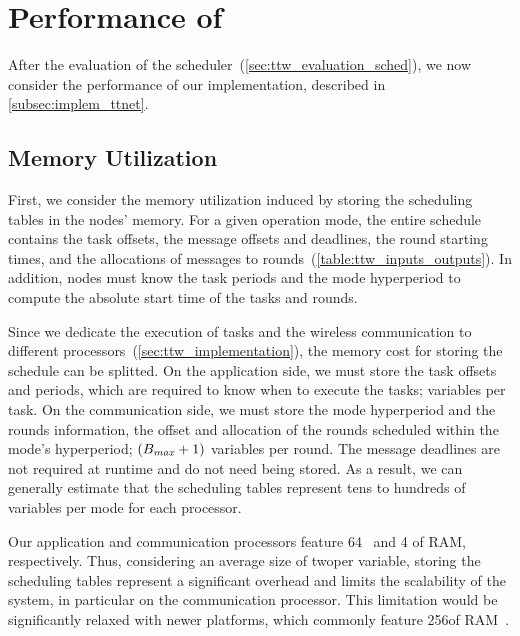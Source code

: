 \section{Performance of \TTnet}
\label{sec:ttw_evaluation_implem}

After the evaluation of the \TTW scheduler~(\cref{sec:ttw_evaluation_sched}), we now consider the performance of our \TTnet implementation, described in \cref{subsec:implem_ttnet}.

\subsection{Memory Utilization}

First, we consider the memory utilization induced by storing the scheduling tables in the nodes' memory.
For a given operation mode, the entire schedule contains the task offsets, the message offsets and deadlines, the round starting times, and the allocations of messages to rounds~(\cref{table:ttw_inputs_outputs}).
In addition, nodes must know the task periods and the mode hyperperiod to compute the absolute start time of the tasks and rounds.

Since we dedicate the execution of tasks and the wireless communication to different processors~(\cref{sec:ttw_implementation}), the memory cost for storing the schedule can be splitted.
On the application side, we must store the task offsets and periods, which are required to know when to execute the tasks;  variables per task.
On the communication side, we must store the mode hyperperiod and the rounds information, \ie the offset and allocation of the rounds scheduled within the mode's hyperperiod; \ie $(B_{\mathit{max}}+1)$ variables per round.
The message deadlines are not required at runtime and do not need being stored.
As a result, we can generally estimate that the scheduling tables represent tens to hundreds of variables per mode for each processor.

Our application and communication processors feature 64\kB~\cite{msp432} and 4\kB\cite{CC430F6137} of RAM, respectively. Thus, considering an average size of two\bytes per variable, storing the scheduling tables represent a significant overhead and limits the scalability of the system, in particular on the communication processor.
This limitation would be significantly relaxed with newer platforms, which commonly feature 256\kB of RAM~\cite{nRF52840}.


